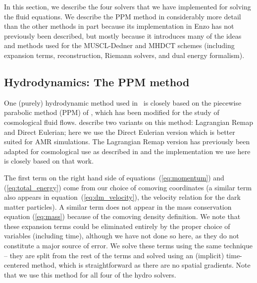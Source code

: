 In this section, we describe the four solvers that we have implemented for
solving the fluid equations.  We describe the PPM method in considerably
more detail than the other methods in part
because its implementation in Enzo has not previously been described,
but mostly because it introduces many of the ideas and methods used for
the MUSCL-Dedner and MHDCT schemes (including expansion terms,
reconstruction, Riemann solvers, and dual energy formalism).

\subsection{Hydrodynamics: The PPM method}
\label{sec.hydro.ppm}

One (purely) hydrodynamic method used in \enzo\ is closely based on the
piecewise parabolic method (PPM) of
\citet{1984JCoPh..54..174C}, which has been
modified for the study of cosmological fluid flows.  
\citet{1984JCoPh..54..174C} describe two variants on this method:
Lagrangian Remap and Direct Eulerian; here we use the Direct Eulerian
version which is better suited for AMR simulations.  The Lagrangian
Remap version has previously been adapted for cosmological use
as described in \citet{1995CoPhC..89..149B} and the implementation
we use here is closely based on that work.

The first term on the right hand side of equations~(\ref{eq:momentum}) and
(\ref{eq:total_energy}) come from our choice of comoving coordinates
(a similar term also appears in equation~(\ref{eq:dm_velocity}), the velocity 
relation for the dark matter particles).  A similar term does not
appear in the mass conservation equation (\ref{eq:mass}) because
of the comoving density definition.   
We note that these expansion terms could be
eliminated entirely by the proper choice of variables (including time),
although we have not done so here, as they do not constitute a major
source of error.  We solve these terms
using the same technique -- they are split from the rest of the terms and
solved using an (implicit) time-centered method, which is straightforward
as there are no spatial gradients.  Note that we use this method for
all four of the hydro solvers.


